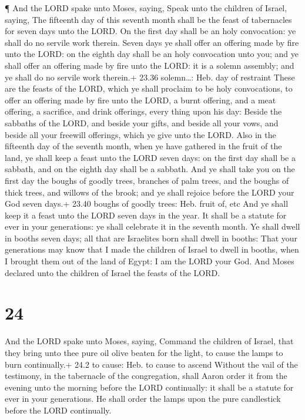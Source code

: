  ¶ And the LORD spake unto Moses, saying, 
Speak unto the children of Israel, saying, The fifteenth day of this
seventh month shall be the feast of tabernacles for seven days unto the
LORD.  On the first day shall be an holy convocation: ye
shall do no servile work therein.  Seven days ye shall
offer an offering made by fire unto the LORD: on the eighth day shall be
an holy convocation unto you; and ye shall offer an offering made by
fire unto the LORD: it is a solemn assembly; and ye shall do no servile
work therein.+ 23.36 solemn\ldots: Heb. day of restraint 
These are the feasts of the LORD, which ye shall proclaim to be holy
convocations, to offer an offering made by fire unto the LORD, a burnt
offering, and a meat offering, a sacrifice, and drink offerings, every
thing upon his day:  Beside the sabbaths of the LORD, and
beside your gifts, and beside all your vows, and beside all your
freewill offerings, which ye give unto the LORD.  Also in
the fifteenth day of the seventh month, when ye have gathered in the
fruit of the land, ye shall keep a feast unto the LORD seven days: on
the first day shall be a sabbath, and on the eighth day shall be a
sabbath.  And ye shall take you on the first day the boughs
of goodly trees, branches of palm trees, and the boughs of thick trees,
and willows of the brook; and ye shall rejoice before the LORD your God
seven days.+ 23.40 boughs of goodly trees: Heb. fruit of, etc
 And ye shall keep it a feast unto the LORD seven days in
the year. It shall be a statute for ever in your generations: ye shall
celebrate it in the seventh month.  Ye shall dwell in
booths seven days; all that are Israelites born shall dwell in booths:
 That your generations may know that I made the children of
Israel to dwell in booths, when I brought them out of the land of Egypt:
I am the LORD your God.  And Moses declared unto the
children of Israel the feasts of the LORD.

\hypertarget{section-23}{%
\section{24}\label{section-23}}

 And the LORD spake unto Moses, saying,  Command
the children of Israel, that they bring unto thee pure oil olive beaten
for the light, to cause the lamps to burn continually.+ 24.2 to cause:
Heb. to cause to ascend  Without the vail of the testimony,
in the tabernacle of the congregation, shall Aaron order it from the
evening unto the morning before the LORD continually: it shall be a
statute for ever in your generations.  He shall order the
lamps upon the pure candlestick before the LORD continually.

